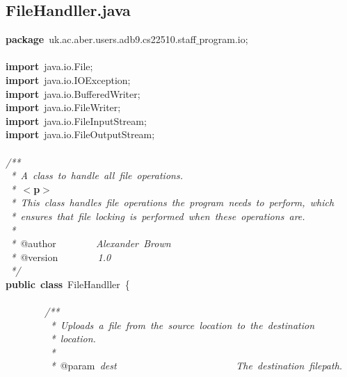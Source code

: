 \subsection{FileHandller.java}
\scriptsize
\sffamily
\noindent
\mbox{}\textbf{package}\ uk.ac.aber.users.adb9.cs22510.staff$\_$program.io; \\
\mbox{} \\
\mbox{}\textbf{import}\ java.io.File; \\
\mbox{}\textbf{import}\ java.io.IOException; \\
\mbox{}\textbf{import}\ java.io.BufferedWriter; \\
\mbox{}\textbf{import}\ java.io.FileWriter; \\
\mbox{}\textbf{import}\ java.io.FileInputStream; \\
\mbox{}\textbf{import}\ java.io.FileOutputStream; \\
\mbox{} \\
\mbox{}\textit{/**} \\
\mbox{}\textit{\ *\ A\ class\ to\ handle\ all\ file\ operations.} \\
\mbox{}\textit{\ *\ }\textbf{$<$p$>$} \\
\mbox{}\textit{\ *\ This\ class\ handles\ file\ operations\ the\ program\ needs\ to\ perform,\ which} \\
\mbox{}\textit{\ *\ ensures\ that\ file\ locking\ is\ performed\ when\ these\ operations\ are.} \\
\mbox{}\textit{\ *} \\
\mbox{}\textit{\ *\ }@author\textit{\ \ \ \ \ \ \ \ Alexander\ Brown} \\
\mbox{}\textit{\ *\ }@version\textit{\ \ \ \ \ \ \ \ 1.0} \\
\mbox{}\textit{\ */} \\
\mbox{}\textbf{public}\ \textbf{class}\ FileHandller\ \{ \\
\mbox{} \\
\mbox{}\ \ \ \ \ \ \ \ \textit{/**} \\
\mbox{}\textit{\ \ \ \ \ \ \ \ \ *\ Uploads\ a\ file\ from\ the\ source\ location\ to\ the\ destination\ } \\
\mbox{}\textit{\ \ \ \ \ \ \ \ \ *\ location.} \\
\mbox{}\textit{\ \ \ \ \ \ \ \ \ *} \\
\mbox{}\textit{\ \ \ \ \ \ \ \ \ *\ }@param\textit{\ dest\ \ \ \ \ \ \ \ \ \ \ \ \ \ \ \ \ \ \ \ \ \ \ \ The\ destination\ filepath.} \\
